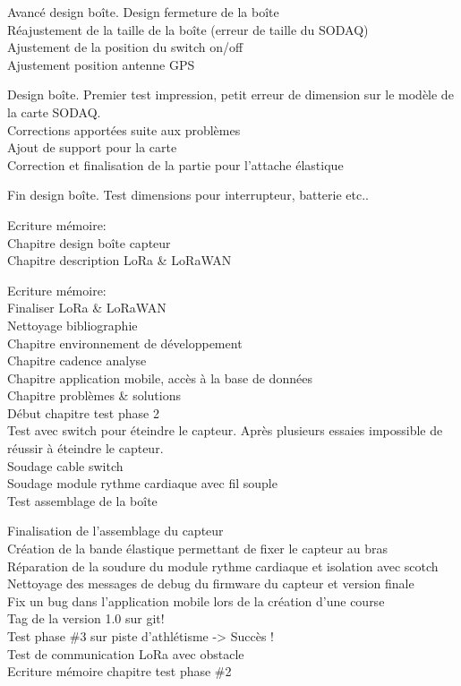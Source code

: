 \begin{multicols}{2}
Avancé design boîte. Design fermeture de la boîte\\
Réajustement de la taille de la boîte (erreur de taille du SODAQ)\\
Ajustement de la position du switch on/off\\
Ajustement position antenne GPS

Design boîte. Premier test impression, petit erreur de dimension sur le modèle de la carte SODAQ.\\
Corrections apportées suite aux problèmes\\
Ajout de support pour la carte\\
Correction et finalisation de la partie pour l’attache élastique

Fin design boîte. Test dimensions pour interrupteur, batterie etc..

Ecriture mémoire:\\
Chapitre design boîte capteur\\
Chapitre description LoRa \& LoRaWAN

Ecriture mémoire:\\
Finaliser LoRa \& LoRaWAN\\
Nettoyage bibliographie\\
Chapitre environnement de développement\\
Chapitre cadence analyse\\
Chapitre application mobile, accès à la base de données\\
Chapitre problèmes \& solutions\\
Début chapitre test phase 2\\
Test avec switch pour éteindre le capteur. Après plusieurs essaies impossible de réussir à éteindre le capteur.\\
Soudage cable switch\\
Soudage module rythme cardiaque avec fil souple\\
Test assemblage de la boîte

Finalisation de l’assemblage du capteur\\
Création de la bande élastique permettant de fixer le capteur au bras\\
Réparation de la soudure du module rythme cardiaque et isolation avec scotch\\
Nettoyage des messages de debug du firmware du capteur et version finale\\
Fix un bug dans l’application mobile lors de la création d’une course\\
Tag de la version 1.0 sur git!\\
Test phase \#3 sur piste d’athlétisme -> Succès !\\
Test de communication LoRa avec obstacle\\
Ecriture mémoire chapitre test phase \#2


\end{multicols}
